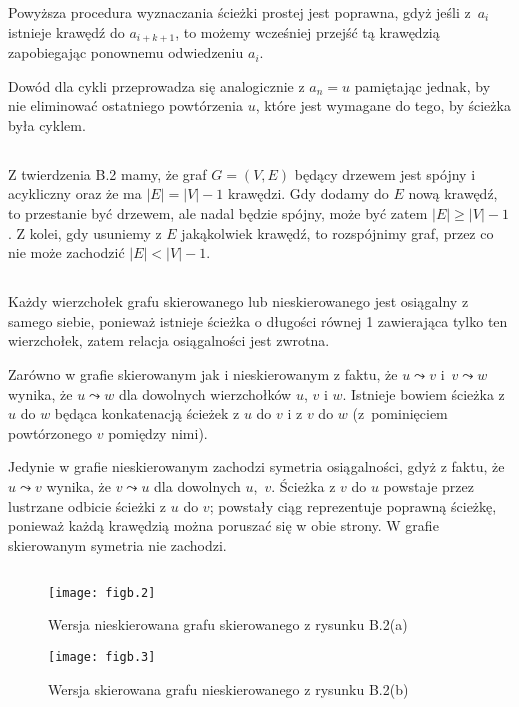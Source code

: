 Powyższa procedura wyznaczania ścieżki prostej jest poprawna, gdyż jeśli z~$a_i$ istnieje krawędź do $a_{i+k+1}$, to możemy wcześniej przejść tą krawędzią zapobiegając ponownemu odwiedzeniu $a_i$.

Dowód dla cykli przeprowadza się analogicznie z $a_n=u$ pamiętając jednak, by nie eliminować ostatniego powtórzenia $u$, które jest wymagane do tego, by ścieżka była cyklem.

\subsection{} %
Z twierdzenia B.2 mamy, że graf $G=(V,E)$ będący drzewem jest spójny i acykliczny oraz że ma $|E|=|V|-1$ krawędzi. Gdy dodamy do $E$ nową krawędź, to przestanie być drzewem, ale nadal będzie spójny, może być zatem $|E|\ge|V|-1$. Z kolei, gdy usuniemy z $E$ jakąkolwiek krawędź, to rozspójnimy graf, przez co nie może zachodzić $|E|<|V|-1$.

\subsection{} %
Każdy wierzchołek grafu skierowanego lub nieskierowanego jest osiągalny z samego siebie, ponieważ istnieje ścieżka o długości równej 1 zawierająca tylko ten wierzchołek, zatem relacja osiągalności jest zwrotna.

Zarówno w grafie skierowanym jak i nieskierowanym z faktu, że $u\leadsto v$ i~$v\leadsto w$ wynika, że $u\leadsto w$ dla dowolnych wierzchołków $u$, $v$ i $w$. Istnieje bowiem ścieżka z $u$ do $w$ będąca konkatenacją ścieżek z $u$ do $v$ i z $v$ do $w$ (z~pominięciem powtórzonego $v$ pomiędzy nimi).

Jedynie w grafie nieskierowanym zachodzi symetria osiągalności, gdyż z faktu, że $u\leadsto v$ wynika, że $v\leadsto u$ dla dowolnych $u$,~$v$. Ścieżka z $v$ do $u$ powstaje przez lustrzane odbicie ścieżki z $u$ do $v$; powstały ciąg reprezentuje poprawną ścieżkę, ponieważ każdą krawędzią można poruszać się w obie strony. W grafie skierowanym symetria nie zachodzi.

\subsection{} %
\begin{figure}[!h]
	\begin{center}
		\texttt{[image: figb.2]}
	\end{center}
	\caption{Wersja nieskierowana grafu skierowanego z rysunku B.2(a)}
\end{figure}
\begin{figure}[!h]
	\begin{center}
		\texttt{[image: figb.3]}
	\end{center}
	\caption{Wersja skierowana grafu nieskierowanego z rysunku B.2(b)}
\end{figure}

